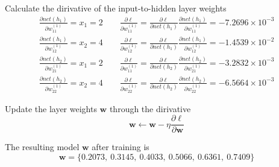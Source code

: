 \documentclass{article}
\begin{document}
Calculate the dirivative of the input-to-hidden layer weights
\begin{gather*}
\frac{\partial net(h_{1})}{\partial w_{11}^{(1)}} = x_{1} = 2 \qquad
\frac{\partial \ell}{\partial w_{11}^{(1)}} = \frac{\partial \ell}{\partial net(h_{1})} 
\frac{\partial net(h_{1})}{\partial w_{11}^{(1)}} = -7.2696 \times 10^{-3} \\[3mm]
\frac{\partial net(h_{1})}{\partial w_{12}^{(1)}} = x_{2} = 4 \qquad
\frac{\partial \ell}{\partial w_{12}^{(1)}} = \frac{\partial \ell}{\partial net(h_{1})} 
\frac{\partial net(h_{1})}{\partial w_{12}^{(1)}} = -1.4539 \times 10^{-2} \\[3mm]
\frac{\partial net(h_{2})}{\partial w_{21}^{(1)}} = x_{1} = 2 \qquad
\frac{\partial \ell}{\partial w_{11}^{(1)}} = \frac{\partial \ell}{\partial net(h_{2})} 
\frac{\partial net(h_{2})}{\partial w_{21}^{(1)}} = -3.2832 \times 10^{-3} \\[3mm]
\frac{\partial net(h_{2})}{\partial w_{22}^{(1)}} = x_{2} = 4 \qquad
\frac{\partial \ell}{\partial w_{22}^{(1)}} = \frac{\partial \ell}{\partial net(h_{2})} 
\frac{\partial net(h_{2})}{\partial w_{22}^{(1)}} = -6.5664 \times 10^{-3}
\end{gather*}

Update the layer weights $\boldsymbol{w}$ through the dirivative
\begin{equation*}
\boldsymbol{w} \leftarrow \boldsymbol{w} - \eta \frac{\partial \ell}{\partial \boldsymbol{w}}
\end{equation*}

The resulting model $\boldsymbol{w}$ after training is
\begin{equation*}
\boldsymbol{w} = \{ 0.2073,\ 0.3145,\ 0.4033,\ 0.5066,\ 0.6361,\ 0.7409 \}
\end{equation*}
\end{document}
